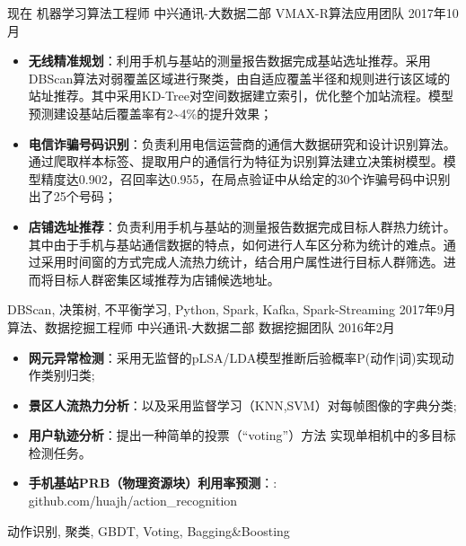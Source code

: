 %
%



 
\begin{experiences}
			
 \experience
    {现在}   {机器学习算法工程师}{ 中兴通讯-大数据二部}{ VMAX-R算法应用团队}
    {2017年10月} {
                    \vskip 0.05cm
                    \begin{itemize}\setlength{\itemsep}{0.15cm}
                        \item \textbf{无线精准规划}：利用手机与基站的测量报告数据完成基站选址推荐。采用DBScan算法对弱覆盖区域进行聚类，由自适应覆盖半径和规则进行该区域的站址推荐。其中采用KD-Tree对空间数据建立索引，优化整个加站流程。模型预测建设基站后覆盖率有2\textasciitilde4\%的提升效果；
                        \item \textbf{电信诈骗号码识别}：负责利用电信运营商的通信大数据研究和设计识别算法。通过爬取样本标签、提取用户的通信行为特征为识别算法建立决策树模型。模型精度达0.902，召回率达0.955，在局点验证中从给定的30个诈骗号码中识别出了25个号码；
                        \item \textbf{店铺选址推荐}：负责利用手机与基站的测量报告数据完成目标人群热力统计。其中由于手机与基站通信数据的特点，如何进行人车区分称为统计的难点。通过采用时间窗的方式完成人流热力统计，结合用户属性进行目标人群筛选。进而将目标人群密集区域推荐为店铺候选地址。
                    \end{itemize}
                  }
                    {DBScan, 决策树, 不平衡学习, Python, Spark, Kafka, Spark-Streaming}
  \emptySeparator
  \experience
    { 2017年9月} {算法、数据挖掘工程师}{ 中兴通讯-大数据二部}{ 数据挖掘团队}
    {2016年2月}    {
                    \vskip 0.05cm
                      \begin{itemize}\setlength{\itemsep}{0.15cm}
                        \item \textbf{网元异常检测}：采用无监督的pLSA/LDA模型推断后验概率P(动作|词)实现动作类别归类;
                        \item \textbf{景区人流热力分析}：以及采用监督学习（KNN,SVM）对每帧图像的字典分类;                    
                        \item \textbf{用户轨迹分析}：提出一种简单的投票（``voting''）方法 实现单相机中的多目标检测任务。
                        \item \textbf{手机基站PRB（物理资源块）利用率预测}：\faGithub:  {github.com/huajh/action\_recognition}                                                                                          
                      \end{itemize}
                    }
                    {动作识别, 聚类, GBDT, Voting, Bagging\&Boosting}
	

\end{experiences}

